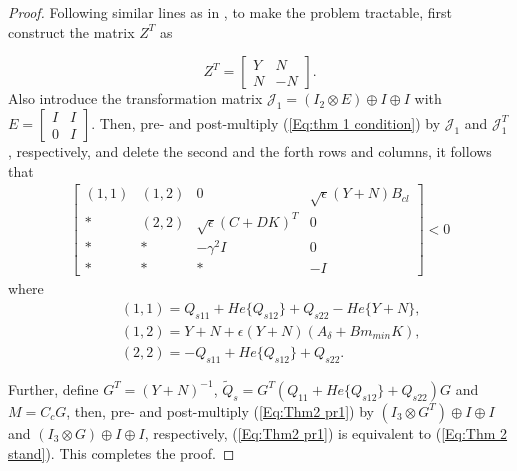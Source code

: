 \documentclass[journal,onecolumn]{IEEEtran}
\begin{document}
 \begin{proof}
Following similar lines as in \cite{OliveiraMC02},  to make the
 problem tractable, first construct the matrix $Z^T$ as

\begin{equation}
\label{Eq:Thm 3
pr2}Z^T=\left[\begin{array}{cc}Y&N\\N&-N\end{array}\right].
\end{equation}
 Also introduce the
transformation matrix  $\mathcal {J}_1=(I_2\otimes E)\oplus I\oplus
I$ with $E=\left[\begin{array}{cc}I&I\\0&I\end{array}\right]$. Then,
pre- and post-multiply (\ref{Eq:thm 1 condition}) by $\mathcal
{J}_1$ and $\mathcal {J}_1^T$, respectively, and delete the second
and the forth   rows and columns, it follows that
\begin{equation}\begin{array}{l}
\label{Eq:Thm2 pr1} \left[\begin{array}{ccccc} (1,1)&
(1,2)&0&\sqrt{\epsilon}(Y+N)B_{cl}\\
 *&(2,2)&\sqrt{\epsilon}(C+DK)^T&0\\

*&*&-\gamma^2 I&0
\\ *&
*&*& - I
\end{array}\right]<0\end{array}
\end{equation}
where
\begin{eqnarray*}
&&(1,1)=Q_{s11}+He\{Q_{s12}\}+Q_{s22}-He\{Y+N\},\\&&
(1,2)=Y+N+\epsilon (Y+N)(A_{\delta}+Bm_{min}K),\\&&
(2,2)=-Q_{s11}+He\{Q_{s12}\}+Q_{s22}.
\end{eqnarray*}

Further, define $G^T=(Y+N)^{-1}$,
$\tilde{Q}_s=G^T(Q_{11}+He\{Q_{s12}\}+Q_{s22})G$ and $M=C_cG$, then,
pre- and post-multiply (\ref{Eq:Thm2 pr1}) by $(I_3\otimes
G^T)\oplus I\oplus I$ and $(I_3\otimes G)\oplus I\oplus I$,
respectively, (\ref{Eq:Thm2 pr1}) is equivalent to (\ref{Eq:Thm 2
stand}). This completes the proof.
 \end{proof}
\end{document}
